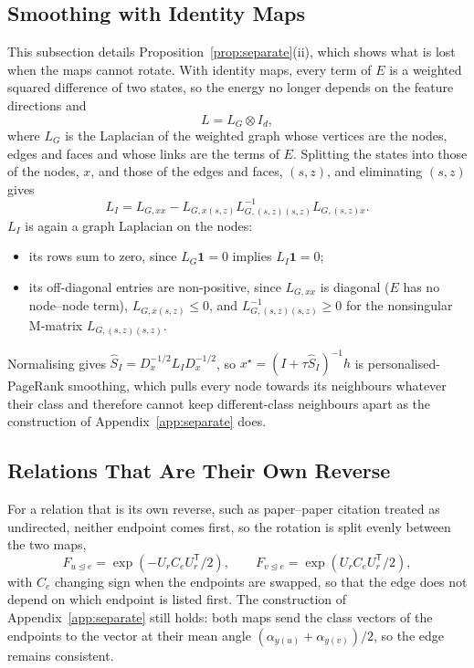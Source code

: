 \documentclass{article}
\newcommand{\transpose}{\mathsf{T}}
\newcommand{\inc}{\trianglelefteq}
\begin{document}
\subsection{Smoothing with Identity Maps}
This subsection details Proposition~\ref{prop:separate}(ii), which shows what is lost when the maps cannot rotate. With identity maps, every term of $E$ is a weighted squared difference of two states, so the energy no longer depends on the feature directions and
\begin{equation*}
  L=L_G\otimes I_d,
\end{equation*}
where $L_G$ is the Laplacian of the weighted graph whose vertices are the nodes, edges and faces and whose links are the terms of $E$. Splitting the states into those of the nodes, $x$, and those of the edges and faces, $(s,z)$, and eliminating $(s,z)$ gives
\begin{equation*}
  L_I=L_{G,xx}-L_{G,x(s,z)}L_{G,(s,z)(s,z)}^{-1}L_{G,(s,z)x}.
\end{equation*}
$L_I$ is again a graph Laplacian on the nodes:
\begin{itemize}
  \item its rows sum to zero, since $L_G\mathbf 1=0$ implies $L_I\mathbf 1=0$;
  \item its off-diagonal entries are non-positive, since $L_{G,xx}$ is diagonal ($E$ has no node--node term), $L_{G,x(s,z)}\le0$, and $L_{G,(s,z)(s,z)}^{-1}\ge0$ for the nonsingular M-matrix $L_{G,(s,z)(s,z)}$.
\end{itemize}
Normalising gives $\hat S_I=D_x^{-1/2}L_ID_x^{-1/2}$, so $x^\star=(I+\tau\hat S_I)^{-1}h$ is personalised-PageRank smoothing, which pulls every node towards its neighbours whatever their class and therefore cannot keep different-class neighbours apart as the construction of Appendix~\ref{app:separate} does.

\subsection{Relations That Are Their Own Reverse}
For a relation that is its own reverse, such as paper--paper citation treated as undirected, neither endpoint comes first, so the rotation is split evenly between the two maps,
\begin{equation*}
  F_{u\inc e}=\exp(-U_rC_eU_r^{\transpose}/2),\qquad F_{v\inc e}=\exp(U_rC_eU_r^{\transpose}/2),
\end{equation*}
with $C_e$ changing sign when the endpoints are swapped, so that the edge does not depend on which endpoint is listed first. The construction of Appendix~\ref{app:separate} still holds: both maps send the class vectors of the endpoints to the vector at their mean angle $(\alpha_{y(u)}+\alpha_{y(v)})/2$, so the edge remains consistent.
\end{document}
